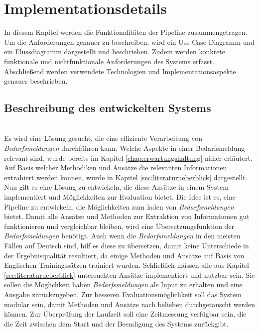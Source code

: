 \chapter{Implementationsdetails}
\label{chap:implementierung}
In diesem Kapitel werden die Funktionalitäten der Pipeline zusammengetragen. Um die Anforderungen genauer zu beschreiben, wird ein Use-Case-Diagramm und ein Flussdiagramm dargestellt und beschrieben. Zudem werden konkrete funktionale und nichtfunktionale Anforderungen des Systems erfasst. Abschließend werden verwendete Technologien und Implementationsaspekte genauer beschrieben.
\section{Beschreibung des entwickelten Systems}
\label{sec:beschreibungsystem}
\\
Es wird eine Lösung gesucht, die eine effiziente Verarbeitung von \emph{Bedarfsmeldungen} durchführen kann. Welche Aspekte in einer Bedarfsmeldung relevant sind, wurde bereits im Kapitel \ref{chap:erwartungshaltung} näher erläutert. Auf Basis welcher Methodiken und Ansätze die relevanten Informationen extrahiert werden können, wurde in Kapitel \ref{sec:literaturueberblick} dargestellt. Nun gilt es eine Lösung zu entwickeln, die diese Ansätze in einem System implementiert und Möglichkeiten zur Evaluation bietet. Die Idee ist es, eine Pipeline zu entwickeln, die Möglichkeiten zum laden von \emph{Bedarfsmeldungen} bietet. Damit alle Ansätze und Methoden zur Extraktion von Informationen gut funktionieren und vergleichbar bleiben, wird eine Übersetzungsfunktion der \emph{Bedarfsmeldungen} benötigt. Auch wenn die \emph{Bedarfsmeldungen} in den meisten Fällen auf Deutsch sind, hilf es diese zu übersetzen, damit keine Unterschiede in der Ergebnisqualität resultiert, da einige Methoden und Ansätze auf Basis von Englischen Trainingssätzen trainiert wurden. Schließlich müssen alle aus Kapitel \ref{sec:literaturueberblick} untersuchten Ansätze implementiert und nutzbar sein. Sie sollen die Möglichkeit haben \emph{Bedarfsmeldungen} als Input zu erhalten und eine Ausgabe zurückzugeben. Zur besseren Evaluationsmöglichkeit soll das System modular sein, damit Methoden und Ansätze nach belieben durchgetauscht werden können. Zur Überprüfung der Laufzeit soll eine Zeitmessung verfügbar sein, die die Zeit zwischen dem Start und der Beendigung des Systems zurückgibt.\\

